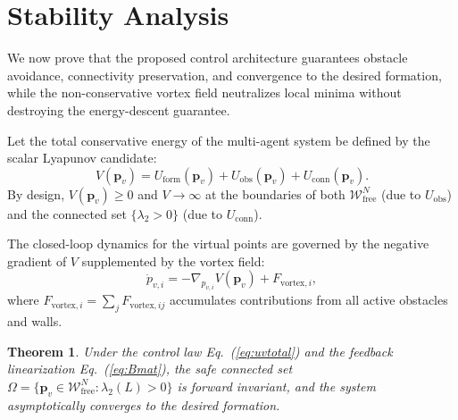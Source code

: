 \documentclass[letterpaper, 10 pt, journal, twoside]{IEEEtran}
\newtheorem{theorem}{Theorem}
\def\scr#1{{\mathcal #1}}
\newcommand{\eqnref}[1]{Eq.~(\ref{#1})}
\begin{document}
\section{Stability Analysis}

We now prove that the proposed control architecture guarantees obstacle
avoidance, connectivity preservation, and convergence to the desired
formation, while the non-conservative vortex field neutralizes local
minima without destroying the energy-descent guarantee.

Let the total conservative energy of the multi-agent system be defined by
the scalar Lyapunov candidate:
\begin{equation}
  V(\mathbf{p}_{v})=U_{\mathrm{form}}(\mathbf{p}_{v})+U_{\mathrm{obs}}(\mathbf{p}_{v})
                   +U_{\mathrm{conn}}(\mathbf{p}_{v}).
  \label{eq:Vlyap}
\end{equation}
By design, $V(\mathbf{p}_{v})\geq 0$ and $V\to\infty$ at the boundaries
of both $\scr{W}_{\mathrm{free}}^{N}$ (due to $U_{\mathrm{obs}}$) and the
connected set $\{\lambda_{2}>0\}$ (due to $U_{\mathrm{conn}}$).

The closed-loop dynamics for the virtual points are governed by the negative
gradient of $V$ supplemented by the vortex field:
\begin{equation}
  \dot{p}_{v,i}=-\nabla_{p_{v,i}}V(\mathbf{p}_{v})+F_{\mathrm{vortex},i},
  \label{eq:closedloop}
\end{equation}
where $F_{\mathrm{vortex},i}=\sum_{j}F_{\mathrm{vortex},ij}$ accumulates
contributions from all active obstacles and walls.

\begin{theorem}
\label{thm:stability}
Under the control law \eqnref{eq:uvtotal} and the feedback linearization
\eqnref{eq:Bmat}, the safe connected set
$\Omega=\{\mathbf{p}_{v}\in\scr{W}_{\mathrm{free}}^{N}:\lambda_{2}(L)>0\}$
is forward invariant, and the system asymptotically converges to the desired
formation.
\end{theorem}
\end{document}
